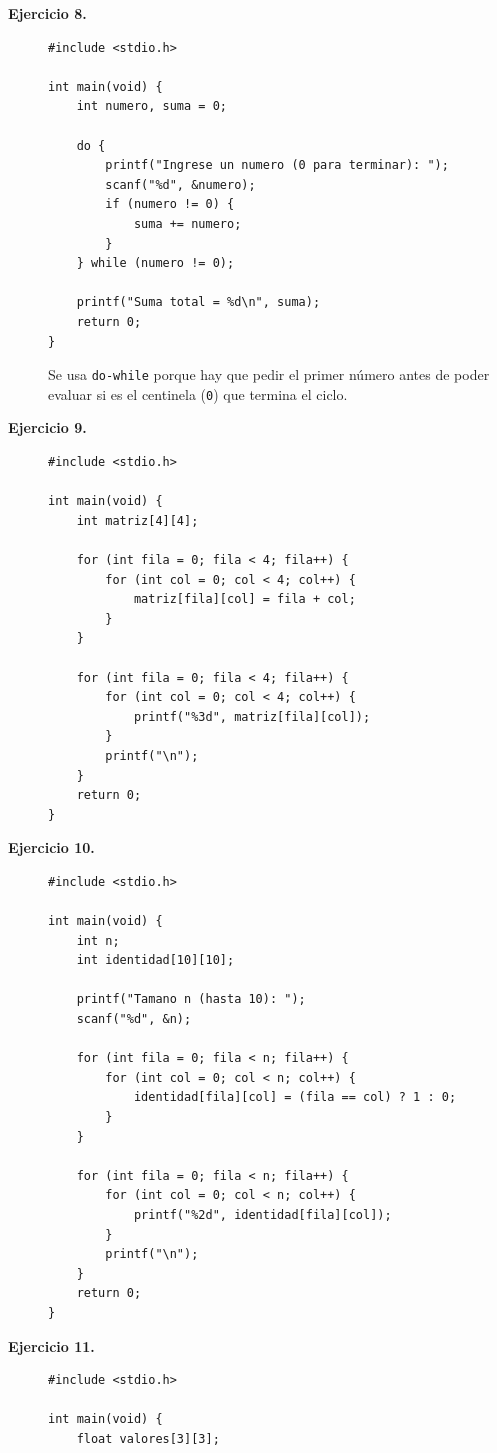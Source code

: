 \documentclass[11pt,letterpaper]{article}
\theoremstyle{definition}
\begin{document}
\begin{description}
\item[\textbf{Ejercicio 8.}]
\begin{lstlisting}
#include <stdio.h>

int main(void) {
    int numero, suma = 0;

    do {
        printf("Ingrese un numero (0 para terminar): ");
        scanf("%d", &numero);
        if (numero != 0) {
            suma += numero;
        }
    } while (numero != 0);

    printf("Suma total = %d\n", suma);
    return 0;
}
\end{lstlisting}
Se usa \texttt{do-while} porque hay que pedir el primer número antes de poder evaluar si es el
centinela (\texttt{0}) que termina el ciclo.

\item[\textbf{Ejercicio 9.}]
\begin{lstlisting}
#include <stdio.h>

int main(void) {
    int matriz[4][4];

    for (int fila = 0; fila < 4; fila++) {
        for (int col = 0; col < 4; col++) {
            matriz[fila][col] = fila + col;
        }
    }

    for (int fila = 0; fila < 4; fila++) {
        for (int col = 0; col < 4; col++) {
            printf("%3d", matriz[fila][col]);
        }
        printf("\n");
    }
    return 0;
}
\end{lstlisting}

\item[\textbf{Ejercicio 10.}]
\begin{lstlisting}
#include <stdio.h>

int main(void) {
    int n;
    int identidad[10][10];

    printf("Tamano n (hasta 10): ");
    scanf("%d", &n);

    for (int fila = 0; fila < n; fila++) {
        for (int col = 0; col < n; col++) {
            identidad[fila][col] = (fila == col) ? 1 : 0;
        }
    }

    for (int fila = 0; fila < n; fila++) {
        for (int col = 0; col < n; col++) {
            printf("%2d", identidad[fila][col]);
        }
        printf("\n");
    }
    return 0;
}
\end{lstlisting}

\item[\textbf{Ejercicio 11.}]
\begin{lstlisting}
#include <stdio.h>

int main(void) {
    float valores[3][3];


\end{lstlisting}
\end{description}
\end{document}
